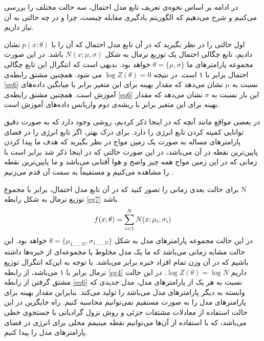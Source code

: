 در ادامه بر اساس نحوه‌ی تعریف تابع مدل احتمال، سه‌ حالت مختلف را بررسی‌ می‌‌کنیم و شرح می‌‌دهیم که الگوریتم یادگیری مقابله چیست، چرا و در چه حالتی به آن نیاز داریم.

اول حالتی را در نظر بگیرید که در آن تابع مدل احتمال
 که آن را با
$p(x;\theta)$
نشان دادیم، تابع چگالی احتمال یک توزیع نرمال
 به شکل
$N(x;\mu,\sigma)$
باشد. در این صورت مجموعه پارامتر‌های ما
$\theta = \{\mu,\sigma\}$
خواهد بود. بدیهی‌ است که انتگرال این تابع چگالی احتمال برابر با ۱ است. در نتیجه
$\log Z(\theta)=0$
می‌ شود. همچنین مشتق رابطه‌ی
\ref{eq6}
نسبت به
$\mu$
نشان می‌‌دهد که مقدار بهینه برای این متغیر
برابر با میانگین داده‌های آموزش است. همچنین مشتق رابطه‌ی
\ref{eq6}
این بار نسبت به
$\sigma$
نشان می‌‌دهد که مقدار بهینه برای این متغیر برابر با ریشه‌ی دوم واریانس داده‌های آموزش است.

در بعضی‌ مواقع مانند آنچه که در اینجا ذکر کردیم، روشی‌ وجود دارد که به صورت دقیق توانایی کمینه کردن تابع انرژی را دارد. برای درک بهتر، اگر تابع انرژی را در فضای پارامتر‌های مساله به صورت یک زمین مواج
در نظر بگیرید که هدف ما پیدا کردن پایین‌ترین نقطه در آن می‌‌باشد، در این  صورت حالتی که در اینجا ذکر شد برابر است با زمانی‌ که در این زمین مواج همه چیز واضح و هوا آفتابی می‌‌باشد و ما پایین‌ترین نقطه را مشاهده می‌‌کنیم و مستقیماً به سمت آن قدم می‌‌زنیم
\cite{woodfordnotes}.

برای حالت بعدی زمانی‌ را تصور کنید که در آن تابع مدل احتمال، برابر با مجموع
N
توزیع نرمال به شکل رابطه
\ref{eg7}
باشد.
\begin{align}
\centering
	f(x;\theta)=\sum_{i=1}^N N(x;\mu_i,\sigma_i)
\label{eg7}
\end{align}
در این حالت مجموعه پارامترهای مدل به شکل
$\theta = \{\mu_{1,...,N},\sigma_{1,...,N} \}$ 
خواهد بود. این حالت مشابه زمانی‌ می‌‌باشد که ما یک مدل مخلوط یا مجموعه‌ای از خبره‌ها 
داشته باشیم که در آن وزن تمام افراد خبره برابر می‌‌باشد. با توجه به این‌که انتگرال توزیع نرمال برابر با ۱ می‌‌باشد، از رابطه
\ref{eg4}
داریم
$\log Z(\theta) = \log N$.
 در این حالت مشتق گرفتن از رابطه
\ref{eq6}
نسبت به هر یک از پارامتر‌های مدل، مدل جدیدی که وابسته به دیگر پارامتر‌های مدل می‌‌باشد را تولید می‌‌کند. بنابراین مقدار بهینه برای پارامتر‌های مدل را به صورت مستقیم نمی‌‌توانیم محاسبه کنیم. راه جایگزین در این حالت استفاده از معادلات مشتقات جزئی‌ 
و روش نزول گرادیانی
 با جستجوی خطی‌
  می‌‌باشد، که با استفاده از آن‌ها می‌‌توانیم نقطه مینیمم محلی برای انرژی در فضای پارامتر‌های مدل را پیدا کنیم.

